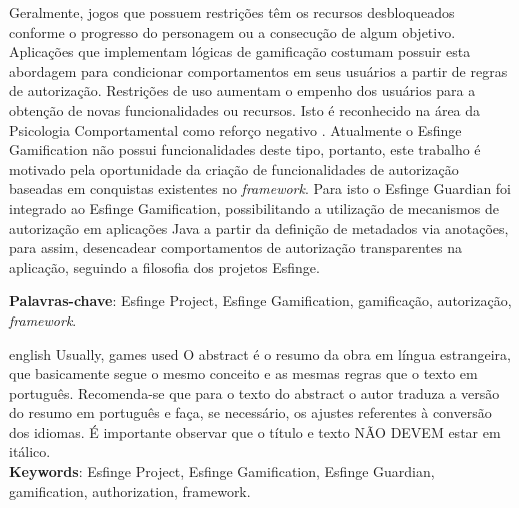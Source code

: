 \setlength{\absparsep}{18pt} %
\begin{resumo}

     Geralmente, jogos que possuem restrições têm os recursos desbloqueados conforme o progresso do personagem ou a consecução de algum objetivo. Aplicações que implementam lógicas de gamificação costumam possuir esta abordagem para condicionar comportamentos em seus usuários a partir de regras de autorização. Restrições de uso aumentam o empenho dos usuários para a obtenção de novas funcionalidades ou recursos. Isto é reconhecido na área da Psicologia Comportamental como reforço negativo \cite{skinner1990behavior}. Atualmente o Esfinge Gamification não possui funcionalidades deste tipo, portanto, este trabalho é motivado pela oportunidade da criação de funcionalidades de autorização baseadas em conquistas existentes no \textit{framework}. Para isto o Esfinge Guardian foi integrado ao Esfinge Gamification, possibilitando a utilização de mecanismos de autorização em aplicações Java a partir da definição de metadados via anotações, para assim, desencadear comportamentos de autorização transparentes na aplicação, seguindo a filosofia dos projetos Esfinge.
     
    \vspace{\onelineskip}
    \noindent
    \textbf{Palavras-chave}: Esfinge Project, Esfinge Gamification, gamificação, autorização, \textit{framework}.
\end{resumo}

\begin{resumo}[Abstract]
    \begin{otherlanguage*}{english}
        Usually, games used O abstract é o resumo da obra em língua estrangeira, que basicamente segue o mesmo conceito e as mesmas regras que o texto em português. Recomenda-se que para o texto do abstract o autor traduza a versão do resumo em português e faça, se necessário, os ajustes referentes à conversão dos idiomas. É importante observar que o título e texto NÃO DEVEM estar em itálico.
	    \vspace{\onelineskip}
	    \noindent
	    \\
	    \textbf{Keywords}: Esfinge Project, Esfinge Gamification, Esfinge Guardian, gamification, authorization, framework.
    \end{otherlanguage*}
\end{resumo}